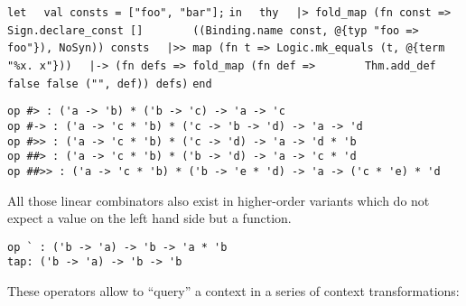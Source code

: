 \begin{isabellebody}
\begin{isamarkuptext}
  \smallskip\begin{mldecls}
\verb|let|\isasep\isanewline%
\verb|  val consts = ["foo", "bar"];|\isasep\isanewline%
\verb|in|\isasep\isanewline%
\verb|  thy|\isasep\isanewline%
\verb|  |\verb,|,\verb|> fold_map (fn const => Sign.declare_const []|\isasep\isanewline%
\verb|       ((Binding.name const, @{typ "foo => foo"}), NoSyn)) consts|\isasep\isanewline%
\verb|  |\verb,|,\verb|>> map (fn t => Logic.mk_equals (t, @{term "%x. x"}))|\isasep\isanewline%
\verb|  |\verb,|,\verb|-> (fn defs => fold_map (fn def =>|\isasep\isanewline%
\verb|       Thm.add_def false false ("", def)) defs)|\isasep\isanewline%
\verb|end|
  \end{mldecls}%
\end{isamarkuptext}%
\isamarkuptrue%
%
\isadelimmlref
%
\endisadelimmlref
%
\isatagmlref
%
\begin{isamarkuptext}%
\begin{mldecls}
  \verb|op #> : ('a -> 'b) * ('b -> 'c) -> 'a -> 'c| \\
  \verb|op #-> : ('a -> 'c * 'b) * ('c -> 'b -> 'd) -> 'a -> 'd| \\
  \verb|op #>> : ('a -> 'c * 'b) * ('c -> 'd) -> 'a -> 'd * 'b| \\
  \verb|op ##> : ('a -> 'c * 'b) * ('b -> 'd) -> 'a -> 'c * 'd| \\
  \verb|op ##>> : ('a -> 'c * 'b) * ('b -> 'e * 'd) -> 'a -> ('c * 'e) * 'd| \\
  \end{mldecls}%
\end{isamarkuptext}%
\isamarkuptrue%
%
\endisatagmlref
{\isafoldmlref}%
%
\isadelimmlref
%
\endisadelimmlref
%
\begin{isamarkuptext}%
\noindent All those linear combinators also exist in higher-order
  variants which do not expect a value on the left hand side
  but a function.%
\end{isamarkuptext}%
\isamarkuptrue%
%
\isadelimmlref
%
\endisadelimmlref
%
\isatagmlref
%
\begin{isamarkuptext}%
\begin{mldecls}
  \verb|op ` : ('b -> 'a) -> 'b -> 'a * 'b| \\
  \verb|tap: ('b -> 'a) -> 'b -> 'b| \\
  \end{mldecls}%
\end{isamarkuptext}%
\isamarkuptrue%
%
\endisatagmlref
{\isafoldmlref}%
%
\isadelimmlref
%
\endisadelimmlref
%
\begin{isamarkuptext}%
\noindent These operators allow to ``query'' a context
  in a series of context transformations:


\end{isamarkuptext}
\end{isabellebody}
